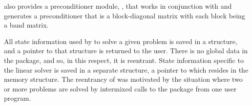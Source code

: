 {\ida} also provides a preconditioner module, {\idabbdpre}, that works
in conjunction with {\nvecp} and generates a preconditioner that is a
block-diagonal matrix with each block being a band matrix.

All state information used by {\ida} to solve a given problem is saved
in a structure, and a pointer to that structure is returned to the
user.  There is no global data in the {\ida} package, and so, in this
respect, it is reentrant. State information specific to the linear
solver is saved in a separate structure, a pointer to which resides in
the {\ida} memory structure. The reentrancy of {\ida} was motivated
by the situation where two or more problems are solved by
intermixed calls to the package from one user program.

